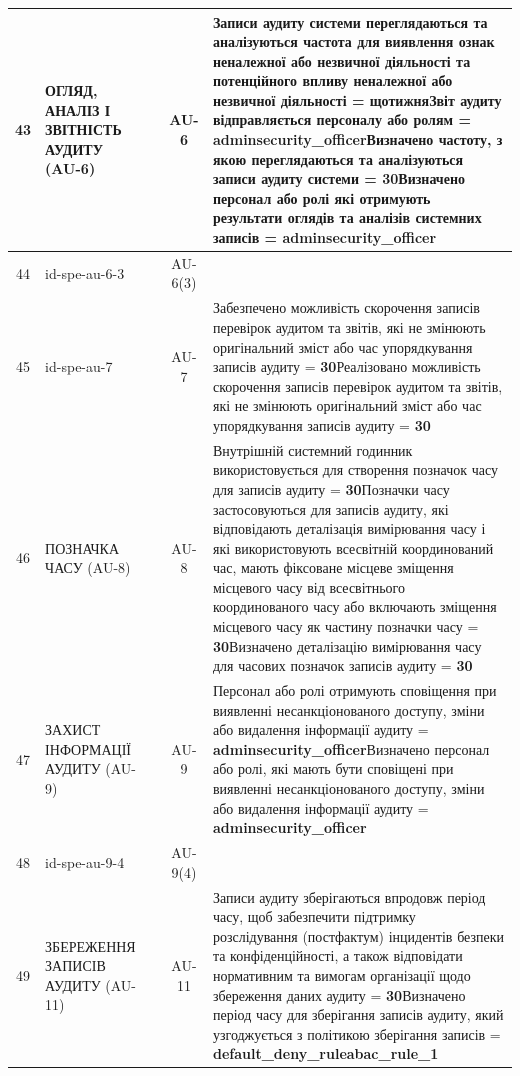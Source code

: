 \documentclass[10pt]{article}
\begin{document}
\begin{longtable}{|c|>{\raggedright\arraybackslash}p{2.5cm}|>{\raggedright\arraybackslash}p{4.5cm}|c|>{\raggedright\arraybackslash}p{4.5cm}|}
43 & ОГЛЯД, АНАЛІЗ І ЗВІТНІСТЬ АУДИТУ (AU-6) &  & AU-6 & Записи аудиту системи переглядаються та аналізуються частота для виявлення ознак неналежної або незвичної діяльності та потенційного впливу неналежної або незвичної діяльності = \textbf{щотижня}\newline Звіт аудиту відправляється персоналу або ролям = \textbf{adminsecurity\_\allowbreak{}officer}\newline Визначено частоту, з якою переглядаються та аналізуються записи аудиту системи = \textbf{30}\newline Визначено персонал або ролі які отримують результати оглядів та аналізів системних записів = \textbf{adminsecurity\_\allowbreak{}officer} \\ \hline
44 & id-spe-au-6-3 &  & AU-6(3) &  \\ \hline
45 & id-spe-au-7 &  & AU-7 & Забезпечено можливість скорочення записів перевірок аудитом та звітів, які не змінюють оригінальний зміст або час упорядкування записів аудиту = \textbf{30}\newline Реалізовано можливість скорочення записів перевірок аудитом та звітів, які не змінюють оригінальний зміст або час упорядкування записів аудиту = \textbf{30} \\ \hline
46 & ПОЗНАЧКА ЧАСУ (AU-8) &  & AU-8 & Внутрішній системний годинник використовується для створення позначок часу для записів аудиту = \textbf{30}\newline Позначки часу застосовуються для записів аудиту, які відповідають деталізація вимірювання часу і які використовують всесвітній координований час, мають фіксоване місцеве зміщення місцевого часу від всесвітнього координованого часу або включають зміщення місцевого часу як частину позначки часу = \textbf{30}\newline Визначено деталізацію вимірювання часу для часових позначок записів аудиту = \textbf{30} \\ \hline
47 & ЗАХИСТ ІНФОРМАЦІЇ АУДИТУ (AU-9) &  & AU-9 & Персонал або ролі отримують сповіщення при виявленні несанкціонованого доступу, зміни або видалення інформації аудиту = \textbf{adminsecurity\_\allowbreak{}officer}\newline Визначено персонал або ролі, які мають бути сповіщені при виявленні несанкціонованого доступу, зміни або видалення інформації аудиту = \textbf{adminsecurity\_\allowbreak{}officer} \\ \hline
48 & id-spe-au-9-4 &  & AU-9(4) &  \\ \hline
49 & ЗБЕРЕЖЕННЯ ЗАПИСІВ АУДИТУ (AU-11) &  & AU-11 & Записи аудиту зберігаються впродовж період часу, щоб забезпечити підтримку розслідування (постфактум) інцидентів безпеки та конфіденційності, а також відповідати нормативним та вимогам організації щодо збереження даних аудиту = \textbf{30}\newline Визначено період часу для зберігання записів аудиту, який узгоджується з політикою зберігання записів = \textbf{default\_\allowbreak{}deny\_\allowbreak{}ruleabac\_\allowbreak{}rule\_\allowbreak{}1} \\ \hline

\end{longtable}
\end{document}
